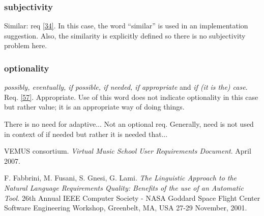 \documentclass[a4paper,twoside, twocolumn,11pt]{article}
\numberwithin{equation}{section}
\begin{document}
\subsubsection{subjectivity}
Similar: req \ref{34}. In this case, the word ``similar'' is used in an implementation suggestion. Also, the similarity is explicitly defined so there is no subjectivity problem here.\\

\subsubsection{optionality}
\textit{possibly, eventually, if possible, if needed, if appropriate} and \textit{if (it is the) case}.
Req. \ref{57}. Appropriate. Use of this word does not indicate optionality in this case but rather value; it is an appropriate way of doing things.

There is no need for adaptive... Not an optional req.
Generally, need is not used in context of if needed but rather it is needed that...



\begin{thebibliography}{9}
VEMUS consortium. \emph{Virtual Music School User Requirements Document}.
April 2007.

F. Fabbrini, M. Fusani, S. Gnesi, G. Lami. \emph{The Linguistic Approach to the Natural Language Requirements Quality: Benefits of the use of an Automatic Tool.} 26th Annual IEEE Computer Society - NASA Goddard Space Flight Center Software Engineering Workshop, Greenbelt, MA, USA 27-29 November, 2001.
\end{thebibliography}
\end{document}
